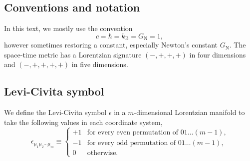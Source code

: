 \documentclass[12pt,twoside]{book}
\begin{document}

\begin{appendices}

\renewcommand{\chaptermark}[1]{%
\markboth{Appendix%
\ \thechapter.%
\ #1}{}}

\renewcommand{\sectionmark}[1]{%
\markright{
\thesection%
\ #1}{}}

\fancyhead{} %
\fancyhead[RO,LE]{\thepage}
\fancyhead[RE]{\leftmark}
\fancyhead[LO]{\rightmark}
\fancyfoot{} %
\renewcommand{\headrulewidth}{0.4pt}


\chapter{Conventions and notation}

In this text, we mostly use the convention
\begin{equation}
c = \hbar = k_{\mathrm{B}} = G_{\mathrm{N}} =1,
\end{equation}
however sometimes restoring a constant, especially Newton's constant $G_{\mathrm{N}}$.
The space-time metric has a Lorentzian signature $(-,+,+,+)$ in four dimensions and $(-,+,+,+,+)$ in five dimensions.


\section{Levi-Civita symbol}\label{App:LC-symbol}

We define the Levi-Civita symbol $\epsilon$ in a $m$-dimensional Lorentzian manifold to take the following values in each coordinate system,
\begin{equation}\label{LC-symbol}
\epsilon_{\mu_{1}\mu_{2}\cdots\mu_{m}} \equiv \begin{cases}
+1 & \text{for every even permutation of $01\dots(m-1)$,} \\
-1 & \text{for every odd permutation of $01\dots(m-1)$,} \\
0 & \text{otherwise.}
\end{cases}
\end{equation}


\end{appendices}
\end{document}
